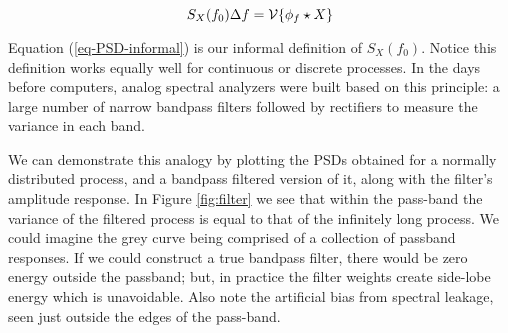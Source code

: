 \documentclass[11pt]{article}\usepackage{graphicx, color}
\begin{document}
\begin{equation}
\label{eq-PSD-informal}
S_X ( f_0 ) \Delta f = \mathcal{V} \{\phi_f \star X\}
\end{equation}

Equation (\ref{eq-PSD-informal}) is our informal definition of $S_X ( f_0 )$. 
Notice this definition works equally well for continuous
or discrete processes. 
In the days before computers, 
analog spectral analyzers were built based on this 
principle: a large number of narrow bandpass filters
followed by rectifiers to measure the variance in each band.

We can demonstrate this analogy by plotting the 
PSDs obtained for a normally distributed process, and
a bandpass filtered version of it, along with
the filter's amplitude response.
In Figure \ref{fig:filter} we see that
within the pass-band the variance
of the filtered process
is equal to that of the infinitely long process.
We could imagine the grey curve being comprised of a 
collection of passband responses.
If we could construct a true bandpass filter, there would be 
zero energy outside the passband; but, in practice 
the filter weights create side-lobe 
energy which is unavoidable.
Also note the artificial bias
from spectral leakage, seen just outside the 
edges of the pass-band.
%
\end{document}

